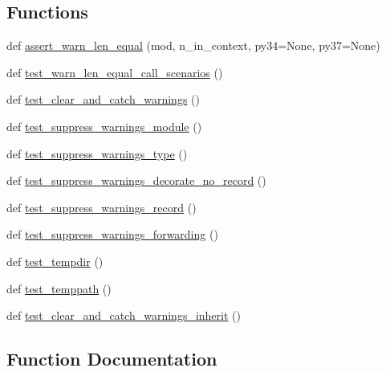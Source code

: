 \subsection*{Functions}
\begin{DoxyCompactItemize}
\item 
def \hyperlink{namespacenumpy_1_1testing_1_1tests_1_1test__utils_ab30b9f08c5a4fa45e74537fd7b6de731}{assert\+\_\+warn\+\_\+len\+\_\+equal} (mod, n\+\_\+in\+\_\+context, py34=None, py37=None)
\item 
def \hyperlink{namespacenumpy_1_1testing_1_1tests_1_1test__utils_a4464c76743224a092d1dcf4b6f521df6}{test\+\_\+warn\+\_\+len\+\_\+equal\+\_\+call\+\_\+scenarios} ()
\item 
def \hyperlink{namespacenumpy_1_1testing_1_1tests_1_1test__utils_ad222c68f98fea56f42be99400a27d969}{test\+\_\+clear\+\_\+and\+\_\+catch\+\_\+warnings} ()
\item 
def \hyperlink{namespacenumpy_1_1testing_1_1tests_1_1test__utils_a89de898b87545bda349e10e01d1fac77}{test\+\_\+suppress\+\_\+warnings\+\_\+module} ()
\item 
def \hyperlink{namespacenumpy_1_1testing_1_1tests_1_1test__utils_a35d006380cb66f352accb2d6ecd0a74a}{test\+\_\+suppress\+\_\+warnings\+\_\+type} ()
\item 
def \hyperlink{namespacenumpy_1_1testing_1_1tests_1_1test__utils_a9173f6129d972d1870adf5ac441f9490}{test\+\_\+suppress\+\_\+warnings\+\_\+decorate\+\_\+no\+\_\+record} ()
\item 
def \hyperlink{namespacenumpy_1_1testing_1_1tests_1_1test__utils_ab170452891a84ead507e0e3e2681f500}{test\+\_\+suppress\+\_\+warnings\+\_\+record} ()
\item 
def \hyperlink{namespacenumpy_1_1testing_1_1tests_1_1test__utils_a7bf6dd23b8c05a16c46476ad19c6a1fc}{test\+\_\+suppress\+\_\+warnings\+\_\+forwarding} ()
\item 
def \hyperlink{namespacenumpy_1_1testing_1_1tests_1_1test__utils_a3f1bd74cda8a3bbdab84956753e65330}{test\+\_\+tempdir} ()
\item 
def \hyperlink{namespacenumpy_1_1testing_1_1tests_1_1test__utils_aaf04fdc57455c8d831bbf587f8eff9f0}{test\+\_\+temppath} ()
\item 
def \hyperlink{namespacenumpy_1_1testing_1_1tests_1_1test__utils_aeeeb6b41f89756c3c62ec9f4a4362289}{test\+\_\+clear\+\_\+and\+\_\+catch\+\_\+warnings\+\_\+inherit} ()
\end{DoxyCompactItemize}


\subsection{Function Documentation}
\mbox{\label{namespacenumpy_1_1testing_1_1tests_1_1test__utils_ab30b9f08c5a4fa45e74537fd7b6de731}} 
